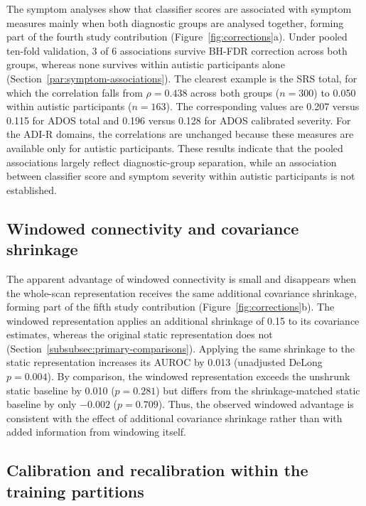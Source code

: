 The symptom analyses show that classifier scores are associated with symptom measures mainly when both diagnostic groups are analysed together, forming part of the fourth study contribution (Figure~\ref{fig:corrections}a). Under pooled ten-fold validation, 3 of 6 associations survive BH-FDR correction across both groups, whereas none survives within autistic participants alone (Section~\ref{par:symptom-associations}). The clearest example is the SRS total, for which the correlation falls from $\rho=0.438$ across both groups ($n=300$) to 0.050 within autistic participants ($n=163$). The corresponding values are 0.207 versus 0.115 for ADOS total and 0.196 versus 0.128 for ADOS calibrated severity. For the ADI-R domains, the correlations are unchanged because these measures are available only for autistic participants. These results indicate that the pooled associations largely reflect diagnostic-group separation, while an association between classifier score and symptom severity within autistic participants is not established.

\subsection{Windowed connectivity and covariance shrinkage}
\label{subsec:results-windowed-shrinkage}

The apparent advantage of windowed connectivity is small and disappears when the whole-scan representation receives the same additional covariance shrinkage, forming part of the fifth study contribution (Figure~\ref{fig:corrections}b). The windowed representation applies an additional shrinkage of 0.15 to its covariance estimates, whereas the original static representation does not (Section~\ref{subsubsec:primary-comparisons}). Applying the same shrinkage to the static representation increases its AUROC by 0.013 (unadjusted DeLong $p=0.004$). By comparison, the windowed representation exceeds the unshrunk static baseline by 0.010 ($p=0.281$) but differs from the shrinkage-matched static baseline by only $-0.002$ ($p=0.709$). Thus, the observed windowed advantage is consistent with the effect of additional covariance shrinkage rather than with added information from windowing itself.

\subsection{Calibration and recalibration within the training partitions}
\label{subsec:results-calibration}

